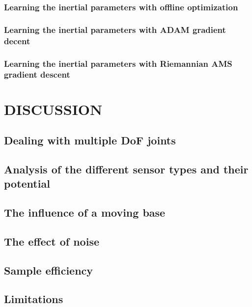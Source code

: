 \documentclass{article}
\begin{document}
\subsubsection{Learning the inertial parameters with offline optimization}
\subsubsection{Learning the inertial parameters with ADAM gradient decent}
\subsubsection{Learning the inertial parameters with Riemannian AMS gradient descent}

\section{DISCUSSION}
\subsection{Dealing with multiple DoF joints}
\subsection{Analysis of the different sensor types and their potential}
\subsection{The influence of a moving base}
\subsection{The effect of noise}
\subsection{Sample efficiency}
\subsection{Limitations}
\end{document}
